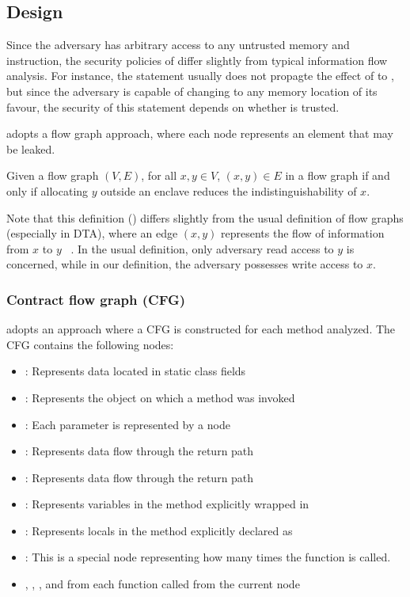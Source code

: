 \subsection{Design}\label{subsec:design}
Since the adversary has arbitrary access to any untrusted memory and instruction,
the security policies of \pname{} differ slightly from typical information flow analysis.
For instance, the statement  usually
does not propagte the effect of  to ,
but since the adversary is capable of changing  to any memory location of its favour,
the security of this statement depends on whether  is trusted.

\pname{} adopts a flow graph approach,
where each node represents an element that may be leaked.

\begin{defin}
	Given a flow graph $(V, E)$, for all $x, y \in V$,
	$(x, y) \in E$ in a flow graph if and only if
	allocating $y$ outside an enclave reduces the indistinguishability of $x$.
\end{defin}

Note that this definition () differs slightly from
the usual definition of flow graphs (especially in DTA),
where an edge $(x, y)$ represents the flow of information from $x$ to $y$ ~\cite{YinHeng2007Pcsi}.
In the usual definition, only adversary read access to $y$ is concerned,
while in our definition, the adversary possesses write access to $x$.

\subsubsection{Contract flow graph (CFG)}
\pname{} adopts an approach where a CFG is constructed for each method analyzed.
The CFG contains the following nodes:
\begin{itemize}
	\item {}: Represents data located in static class fields
	\item {}: Represents the object on which a method was invoked
	\item {}: Each parameter is represented by a node
	\item {}: Represents data flow through the return path
	\item {}: Represents data flow through the return path
	\item {}: Represents variables in the method explicitly wrapped in 
	\item {}: Represents locals in the method explicitly declared as 
	\item {}: This is a special node representing how many times the function is called.
	\item {}, , ,  and 
		from each function called from the current node
\end{itemize}

